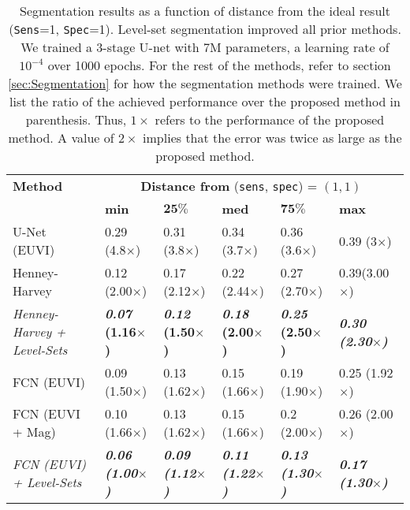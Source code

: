 \begin{table*}[!t]
	\color{blue}
	\centering	
	\caption{\color{blue}
		    Segmentation results as a function of distance from the ideal result
		        ({\tt Sens}=1, {\tt Spec}=1).
		    Level-set segmentation improved all prior methods.    
		    We trained a 3-stage U-net with 7M parameters, a learning rate of $10^{-4}$
		        over 1000 epochs.
		    For the rest of the methods, refer to
		         section \ref{sec:Segmentation} for how the segmentation methods were trained.
		    We list the ratio of the achieved performance over the proposed method in parenthesis.
		    Thus, $1\times$ refers to the performance of the proposed method.
		    A value of $2\times$ implies that the error was twice as large as the proposed method.
		    }
    \label{tab:SegmentationLevelSets}	    
	\begin{tabular}{p{5cm} p{2cm} p{2cm} p{2cm} p{2cm} p{2cm}}
		\toprule
		\textbf{Method} & \multicolumn{5}{c}{\textbf{Distance from} ({\tt sens}, {\tt spec}) = $(1, 1)$}\\
		 & \textbf{min} & $\mathbf{25\%}$ & \textbf{med} & $\mathbf{75\%}$ & \textbf{max}\\
		\midrule
		
		U-Net (EUVI) & 0.29 (4.8$\times$) & 0.31 (3.8$\times$) & 0.34 (3.7$\times$) & 0.36 (3.6$\times$) & 0.39 (3$\times$) \\[0.2cm] %
		
		Henney-Harvey & 0.12 (2.00$\times$) & 0.17 (2.12$\times$) & 0.22 (2.44$\times$) & 0.27 (2.70$\times$) & 0.39(3.00$\times$)\\[0.01cm]
		\textit{Henney-Harvey + Level-Sets} & \textbf{\textit{0.07} (1.16$\times$)} & \textbf{\textit{0.12} (1.50$\times$)} & \textbf{\textit{0.18} (2.00$\times$)} & \textbf{\textit{0.25} (2.50$\times$)} & \textbf{\textit{0.30 (2.30$\times$)}} \\[0.2cm]
		
		FCN (EUVI)& 0.09 (1.50$\times$) & 0.13 (1.62$\times$) & 0.15 (1.66$\times$) & 0.19 (1.90$\times$) & 0.25 (1.92$\times$) \\[0.01cm] %
		FCN (EUVI + Mag) & 0.10 (1.66$\times$) & 0.13 (1.62$\times$) & 0.15 (1.66$\times$) & 0.2 (2.00$\times$) & 0.26 (2.00$\times$) \\[0.01cm] 
		\textit{FCN (EUVI) + Level-Sets} & \textbf{\textit{0.06 (1.00$\times$)} } & \textbf{\textit{0.09 (1.12$\times$)}} & \textbf{\textit{0.11 (1.22$\times$)}} & \textbf{\textit{0.13 (1.30$\times$)}} & \textbf{\textit{0.17 (1.30$\times$)}} \\[0.2cm] 
		

\end{tabular}
\end{table*}
